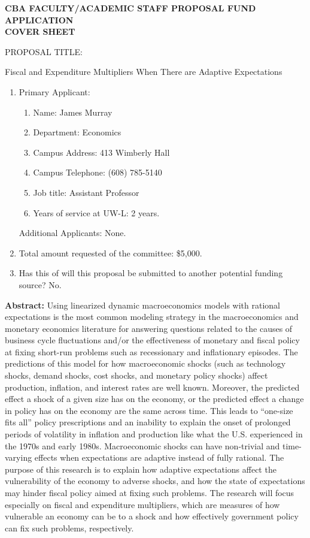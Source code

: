 \documentclass[12pt]{article}
\newcommand{\be}{\begin{enumerate}\setlength{\leftmargin}{0pt}}
\newcommand{\ee}{\end{enumerate}}
\begin{document}
\thispagestyle{empty}
\begin{center}
\textbf{CBA FACULTY/ACADEMIC STAFF PROPOSAL FUND APPLICATION}\\
\textbf{COVER SHEET}\\
\end{center}

PROPOSAL TITLE: \begin{center}Fiscal and Expenditure Multipliers When There are Adaptive Expectations\end{center}

\be
\item Primary Applicant:
  \be
  \item Name: James Murray
  \item Department: Economics
  \item Campus Address: 413 Wimberly Hall
  \item Campus Telephone: (608) 785-5140
  \item Job title: Assistant Professor
  \item Years of service at UW-L: 2 years.
  \ee
  Additional Applicants: None.
\item Total amount requested of the committee: \$5,000.
\item Has this of will this proposal be submitted to another potential funding source? No.
\ee
  
\newpage
\noindent \textbf{Abstract:} Using linearized dynamic macroeconomics models with rational expectations is the most common modeling strategy in the macroeconomics and monetary economics literature for answering questions related to the causes of business cycle fluctuations and/or the effectiveness of monetary and fiscal policy at fixing short-run problems such as recessionary and inflationary episodes.  The predictions of this model for how macroeconomic shocks (such as technology shocks, demand shocks, cost shocks, and monetary policy shocks) affect production, inflation, and interest rates are well known.  Moreover, the predicted effect a shock of a given size has on the economy, or the predicted effect a change in policy has on the economy are the same across time.  This leads to ``one-size fits all'' policy prescriptions and an inability to explain the onset of prolonged periods of volatility in inflation and production like what the U.S. experienced in the 1970s and early 1980s.  Macroeconomic shocks can have non-trivial and time-varying effects when expectations are adaptive instead of fully rational.  The purpose of this research is to explain how adaptive expectations affect the vulnerability of the economy to adverse shocks, and how the state of expectations may hinder fiscal policy aimed at fixing such problems.  The research will focus especially on fiscal and expenditure multipliers, which are measures of how vulnerable an economy can be to a shock and how effectively government policy can fix such problems, respectively.
\end{document}
